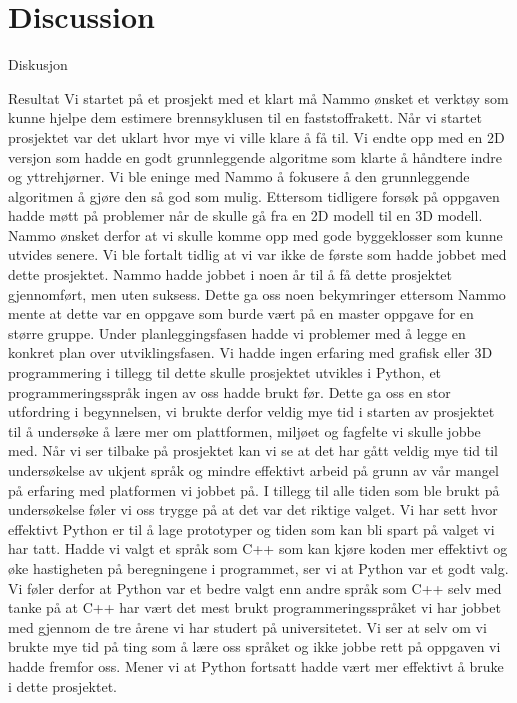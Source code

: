 \chapter{Discussion}
\label{chap:discussion}


Diskusjon

Resultat
Vi startet på et prosjekt med et klart må Nammo ønsket et verktøy som kunne hjelpe dem estimere brennsyklusen til en faststoffrakett.  Når vi startet prosjektet var det uklart hvor mye vi ville klare å få til. Vi endte opp med en 2D versjon som hadde en godt grunnleggende algoritme som klarte å håndtere indre og yttrehjørner. Vi ble eninge med Nammo å fokusere å den grunnleggende algoritmen å gjøre den så god som mulig. Ettersom tidligere forsøk på oppgaven hadde møtt på problemer når de skulle gå fra en 2D modell til en 3D modell. Nammo ønsket derfor at vi skulle komme opp med gode byggeklosser som kunne utvides senere. Vi ble fortalt tidlig at vi var ikke de første som hadde jobbet med dette prosjektet. Nammo hadde jobbet i noen år til å få dette prosjektet gjennomført, men uten suksess. Dette ga oss noen bekymringer ettersom Nammo mente at dette var en oppgave som burde vært på en master oppgave for en større gruppe. Under planleggingsfasen hadde vi problemer med å legge en konkret plan over utviklingsfasen. Vi hadde ingen erfaring med grafisk  eller 3D programmering i tillegg til dette skulle prosjektet utvikles i Python, et programmeringsspråk ingen av oss hadde brukt før. Dette ga oss en stor utfordring i begynnelsen, vi brukte derfor veldig mye tid i starten av prosjektet til å undersøke å lære mer om plattformen, miljøet og fagfelte vi skulle jobbe med. Når vi ser tilbake på prosjektet kan vi se at det har gått veldig mye tid til undersøkelse av ukjent språk og mindre effektivt arbeid på grunn av vår mangel på erfaring med platformen vi jobbet på. I tillegg til alle tiden som ble brukt på undersøkelse føler vi oss trygge på at det var det riktige valget. Vi har sett hvor effektivt Python er til å lage prototyper og tiden som kan bli spart på valget vi har tatt. Hadde vi valgt et språk som C++ som kan kjøre koden mer effektivt og øke hastigheten på beregningene i programmet, ser vi at Python var et godt valg. Vi føler derfor at Python var et bedre valgt enn andre språk som C++ selv med tanke på at C++ har vært det mest brukt programmeringsspråket vi har jobbet med gjennom de tre årene vi har studert på universitetet. Vi ser at selv om vi brukte mye tid på ting som å lære oss språket og ikke jobbe rett på oppgaven vi hadde fremfor oss. Mener vi at Python fortsatt hadde vært mer effektivt å bruke i dette prosjektet.


